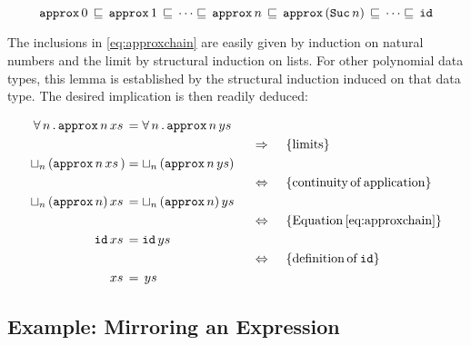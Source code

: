 \begin{equation}
\label{eq:approxchain}
\hs{approx} \, 0 \,
   \sqsubseteq \,
\hs{approx} \, 1 \,
   \sqsubseteq \,
\cdots
   \sqsubseteq \,
\hs{approx} \, n \,
   \sqsubseteq \,
\hs{approx} \, (\hs{Suc} \, n) \,
   \sqsubseteq \,
\cdots
   \sqsubseteq \,
\hs{id}
\end{equation}

The inclusions in \ref{eq:approxchain} are easily given by induction
on natural numbers and the limit by structural induction on lists.
For other polynomial data types, this lemma is established by
the structural induction induced on that data type.
The desired implication is then readily deduced:

\newcommand{\xsys}[2]{#1 \, xs \, #2 & = #1 \, ys #2}
\newcommand{\desca}[1]{  & \hspace{44.5mm}                              \{ \mathrm{#1} \}}
\newcommand{\descra}[1]{ & \hspace{35mm} \Rightarrow     \hspace{4mm} \{ \mathrm{#1} \}}
\newcommand{\descla}[1]{ & \hspace{35mm} \Leftarrow      \hspace{4mm} \{ \mathrm{#1} \}}
\newcommand{\desclra}[1]{& \hspace{35mm} \Leftrightarrow \hspace{4mm} \{ \mathrm{#1} \}}
\begin{align*}
\xsys{\fa{n} \hs{approx} \, n}{}            \\
\descra{limits}                             \\
\xsys{\lub{n} \, (\hs{approx} \, n}{)}      \\
\desclra{continuity \, of \, application}   \\
\xsys{\lub{n} \, (\hs{approx} \, n)}{}      \\
\desclra{Equation \, \ref{eq:approxchain}} \\
\xsys{\hs{id}}{}                            \\
\desclra{definition \, of \, \hs{id}}       \\
\xsys{}{}                                   \\
\end{align*}

\subsection{Example: Mirroring an Expression}

